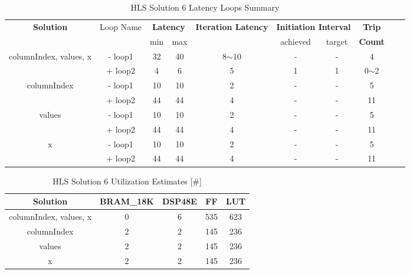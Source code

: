 \begin{table}[H]
	\centering
	\begin{tabular}{|c|c|c|c|c|c|c|c|c|c|}
		\hline
		\multicolumn{1}{|c|}{\textbf{Solution}} & \multicolumn{1}{|c|}{Loop Name} & \multicolumn{2}{|c|}{\textbf{Latency}} & \multicolumn{1}{c|}{\textbf{Iteration Latency}} & \multicolumn{2}{c|}{\textbf{Initiation Interval}} & \multicolumn{1}{c|}{\textbf{Trip}}  \\
		&  & min & max & & achieved & target & \textbf{Count} \\
		\hline
		columnIndex, values, x & - loop1 & 32 & 40 & 8$\sim$10 & - & - & 4 \\
		& + loop2 & 4 & 6 & 5 & 1 & 1 & 0$\sim$2 \\
		\hline
		columnIndex & - loop1 & 10 & 10 & 2 & - & - & 5 \\
		& + loop2 & 44 & 44 & 4 & - & - & 11 \\
		\hline
		values & - loop1 & 10 & 10 & 2 & - & - & 5 \\
		& + loop2 & 44 & 44 & 4 & - & - & 11 \\
		\hline
		x & - loop1 & 10 & 10 & 2 & - & - & 5 \\
		& + loop2 & 44 & 44 & 4 & - & - & 11 \\
		\hline
	\end{tabular}
	\caption{HLS Solution 6 Latency Loops Summary }
	\label{tab:hls-solution-6-loop-summary}
\end{table}

\begin{table}[H]
	\centering
	\begin{tabular}{|c|c|c|c|c|}
		\hline
		\textbf{Solution} & \textbf{BRAM\_18K} & \textbf{DSP48E} & \textbf{FF} & \textbf{LUT} \\
		\hline
		columnIndex, values, x & 0 & 6 & 535 & 623 \\
		\hline
		columnIndex & 2 & 2 & 145 & 236 \\
		\hline
		values & 2 & 2 & 145 & 236 \\
		\hline
		x & 2 & 2 & 145 & 236 \\
		\hline
	\end{tabular}
	\caption{HLS Solution 6 Utilization Estimates [\#]}
	\label{tab:hls-solution-6-utilization-report}
\end{table}

